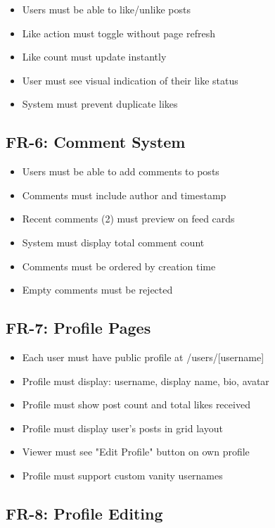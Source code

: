 \documentclass[12pt,a4paper]{report}
\begin{document}
\begin{itemize}
    \item Users must be able to like/unlike posts
    \item Like action must toggle without page refresh
    \item Like count must update instantly
    \item User must see visual indication of their like status
    \item System must prevent duplicate likes
\end{itemize}

\subsection{FR-6: Comment System}

\begin{itemize}
    \item Users must be able to add comments to posts
    \item Comments must include author and timestamp
    \item Recent comments (2) must preview on feed cards
    \item System must display total comment count
    \item Comments must be ordered by creation time
    \item Empty comments must be rejected
\end{itemize}

\subsection{FR-7: Profile Pages}

\begin{itemize}
    \item Each user must have public profile at /users/[username]
    \item Profile must display: username, display name, bio, avatar
    \item Profile must show post count and total likes received
    \item Profile must display user's posts in grid layout
    \item Viewer must see "Edit Profile" button on own profile
    \item Profile must support custom vanity usernames
\end{itemize}

\subsection{FR-8: Profile Editing}
\end{document}
